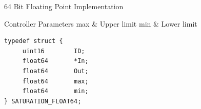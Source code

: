 64 Bit Floating Point Implementation

\begin{XtoCtabular}{Controller Parameters}
max & Upper limit\tabularnewline
\hline
min & Lower limit\tabularnewline
\hline
\end{XtoCtabular}

\begin{lstlisting}
typedef struct {
     uint16        ID;
     float64       *In;
     float64       Out;
     float64       max;
     float64       min;
} SATURATION_FLOAT64;
\end{lstlisting}

\ifdefined \AddTestReports
{}
\fi
